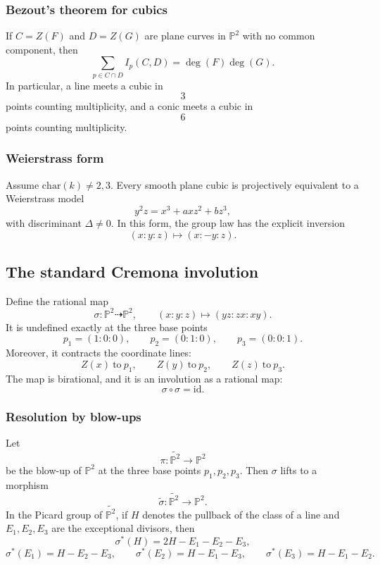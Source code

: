 \documentclass[12pt,a4paper]{article}
\theoremstyle{plain}
\theoremstyle{definition}      %
\begin{document}
\subsubsection*{Bezout's theorem for cubics}

If $C=Z(F)$ and $D=Z(G)$ are plane curves in $\mathbb P^2$ with no common component, then
\[
\sum_{p\in C\cap D} I_p(C,D)=\deg(F)\deg(G).
\]
In particular, a line meets a cubic in
\[
3
\]
points counting multiplicity, and a conic meets a cubic in
\[
6
\]
points counting multiplicity.

\subsubsection*{Weierstrass form}

Assume $\mathrm{char}(k)\neq 2,3$.
Every smooth plane cubic is projectively equivalent to a Weierstrass model
\[
y^2 z = x^3 + a x z^2 + b z^3,
\]
with discriminant $\Delta\neq 0$.
In this form, the group law has the explicit inversion
\[
(x:y:z)\longmapsto (x:-y:z).
\]

\subsection*{The standard Cremona involution}

Define the rational map
\[
\sigma:\mathbb P^2 \dashrightarrow \mathbb P^2,
\qquad
(x:y:z)\longmapsto (yz:zx:xy).
\]
It is undefined exactly at the three base points
\[
p_1=(1:0:0),
\qquad
p_2=(0:1:0),
\qquad
p_3=(0:0:1).
\]
Moreover, it contracts the coordinate lines:
\[
Z(x)\ \text{to}\ p_1,
\qquad
Z(y)\ \text{to}\ p_2,
\qquad
Z(z)\ \text{to}\ p_3.
\]
The map is birational, and it is an involution as a rational map:
\[
\sigma\circ \sigma = \mathrm{id}.
\]

\subsubsection*{Resolution by blow-ups}

Let
\[
\pi:\widetilde{\mathbb P^2}\to \mathbb P^2
\]
be the blow-up of $\mathbb P^2$ at the three base points $p_1,p_2,p_3$.
Then $\sigma$ lifts to a morphism
\[
\widetilde{\sigma}:\widetilde{\mathbb P^2}\to \mathbb P^2.
\]
In the Picard group of $\widetilde{\mathbb P^2}$, if $H$ denotes the pullback of the class of a line
and $E_1,E_2,E_3$ are the exceptional divisors, then
\[
\sigma^{*}(H)=2H-E_1-E_2-E_3,
\]
\[
\sigma^{*}(E_1)=H-E_2-E_3,
\qquad
\sigma^{*}(E_2)=H-E_1-E_3,
\qquad
\sigma^{*}(E_3)=H-E_1-E_2.
\]
\end{document}
